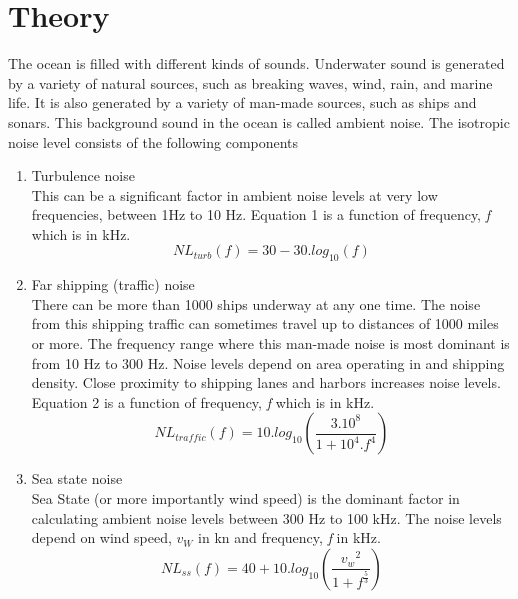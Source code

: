\chapter*{Theory}

\noindent The ocean is filled with different kinds of sounds. Underwater sound is generated by a variety of natural sources, such as breaking waves, wind, rain, and marine life. It is also generated by a variety of man-made sources, such as ships and sonars. This background sound in the ocean is called ambient noise.
The isotropic noise level consists of the following components
\begin{enumerate}
  \item Turbulence noise \\
\noindent This can be a significant factor in ambient noise levels at very low frequencies, between 1Hz to 10 Hz. Equation 1 is a function of frequency, \textit{f} which is in kHz.
\begin{equation}
 NL_{turb}(\textit{f}) = 30 - 30 . log_{10}(\textit{f}) 
\end{equation}

  \item Far shipping (traffic) noise \\
\noindent  There can be more than 1000 ships underway at any one time. The noise from this shipping traffic can sometimes travel up to distances of 1000 miles or more. The frequency range where this man-made noise is most dominant is from 10 Hz to 300 Hz. Noise levels depend on area operating in and shipping density. Close proximity to shipping lanes and harbors increases noise levels. Equation 2 is a function of frequency, \textit{f} which is in kHz.
\begin{equation}
 NL_{traffic}(\textit{f}) = 10 . log_{10}(\frac{3 . 10^8}{ 1 + 10^{4} . \textit{f} ^4 }) 
\end{equation}

  \item Sea state noise \\
\noindent Sea State (or more importantly wind speed) is the dominant factor in calculating ambient
noise levels between 300 Hz to 100 kHz. The noise levels depend on wind speed, $v_W$ in kn and frequency, \textit{f} in kHz.
\begin{equation}
 NL_{ss}(\textit{f}) = 40 + 10 . log_{10}(\frac{{v_w}^2}{ 1 + \textit{f} ^{\frac{5}{3}}}) 
\end{equation}


\end{enumerate}
